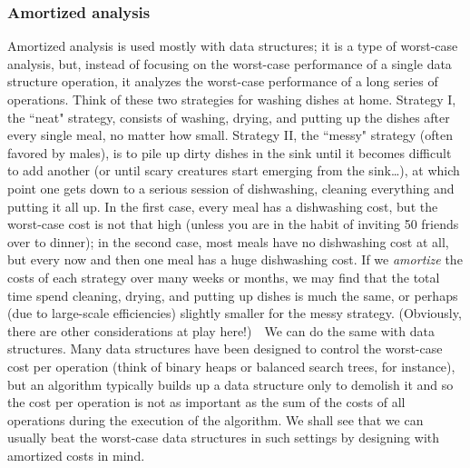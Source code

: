 \documentclass{article}
\begin{document}
\subsubsection{Amortized analysis}
Amortized analysis is used mostly with data structures; it is a type
of worst-case analysis, but, instead of focusing on the worst-case
performance of a single data structure operation, it analyzes the worst-case
performance of a long series of operations.  Think of these two strategies
for washing dishes at home.  Strategy I, the ``neat" strategy, consists of
washing, drying, and putting up the dishes after every single meal, no
matter how small.  Strategy II, the ``messy" strategy (often favored by males),
is to pile up
dirty dishes in the sink until it becomes difficult to add another (or
until scary creatures start emerging from the sink\dots), at which point
one gets down to a serious session of dishwashing, cleaning everything and
putting it all up.  In the first case, every meal has a dishwashing cost,
but the worst-case cost is not that high (unless you are in the habit
of inviting 50 friends over to dinner); in the second case, most meals
have no dishwashing cost at all, but every now and then one meal has a huge
dishwashing cost.  If we \emph{amortize} the costs of each strategy over
many weeks or months, we may find that the total time spend cleaning,
drying, and putting up dishes is much the same, or perhaps (due to large-scale
efficiencies) slightly smaller for the messy strategy.  (Obviously, there
are other considerations at play here!)\ \ We can do the same with data
structures.  Many data structures have been designed to control the
worst-case cost per operation (think of binary heaps or balanced search
trees, for instance), but an algorithm typically builds up a data structure
only to demolish it and so the cost per operation is not as important as
the sum of the costs of all operations during the execution of the algorithm.
We shall see that we can usually beat the worst-case data structures in
such settings by designing with amortized costs in mind.
\end{document}

